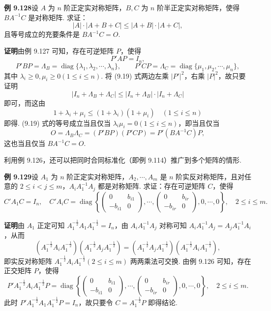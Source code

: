 \documentclass[UTF8,12pt,a4paper,fontset=fandol]{ctexart}
\begin{document}
\noindent\textbf{例 9.128}\quad 设 $A$ 为 $n$ 阶正定实对称矩阵，$B,C$ 为 $n$ 阶半正定实对称矩阵，使得 $BA^{-1}C$ 是对称矩阵. 求证：
\begin{equation}
|A|\cdot|A+B+C|\le |A+B|\cdot|A+C|,
\tag{9.19}
\end{equation}
且等号成立的充要条件是 $BA^{-1}C=O$.

\noindent\textbf{证明}\quad 由例 9.127 可知，存在可逆矩阵 $P$，使得
\[
P'AP=I_n,
\]
\[
P'BP=\Lambda_B=\operatorname{diag}\{\lambda_1,\lambda_2,\cdots,\lambda_n\},\qquad
P'CP=\Lambda_C=\operatorname{diag}\{\mu_1,\mu_2,\cdots,\mu_n\},
\]
其中 $\lambda_i\ge0,\mu_i\ge0(1\le i\le n)$. 将 (9.19) 式两边左乘 $|P'|^2$，右乘 $|P|^2$，故只要证明
\[
|I_n+\Lambda_B+\Lambda_C|\le |I_n+\Lambda_B|\cdot|I_n+\Lambda_C|
\]
即可，而这由
\[
1+\lambda_i+\mu_i\le(1+\lambda_i)(1+\mu_i)\quad (1\le i\le n)
\]
即得. (9.19) 式的等号成立当且仅当 $\lambda_i\mu_i=0(1\le i\le n)$，即当且仅当
\[
O=\Lambda_B\Lambda_C=(P'BP)(P'CP)=P'(BA^{-1}C)P,
\]
这也当且仅当 $BA^{-1}C=O$.

利用例 9.126，还可以把同时合同标准化（即例 9.114）推广到多个矩阵的情形.

\noindent\textbf{例 9.129}\quad 设 $A_1$ 为 $n$ 阶正定实对称矩阵，$A_2,\cdots,A_m$ 是 $n$ 阶实反对称矩阵，且对任意的 $2\le i<j\le m$，$A_iA_1^{-1}A_j$ 都是对称矩阵. 求证：存在可逆矩阵 $C$，使得
\[
C'A_1C=I_n,\quad
C'A_iC=\operatorname{diag}\left\{
\begin{pmatrix}
0&b_{i1}\\
-b_{i1}&0
\end{pmatrix},\cdots,
\begin{pmatrix}
0&b_{ir}\\
-b_{ir}&0
\end{pmatrix},
0,\cdots,0
\right\},\quad 2\le i\le m.
\]

\noindent\textbf{证明}\quad 由 $A_1$ 正定可知 $A_1^{-\frac12}A_1A_1^{-\frac12}=I_n$，由 $A_iA_1^{-1}A_j$ 对称可知 $A_iA_1^{-1}A_j=A_jA_1^{-1}A_i$，从而
\[
(A_1^{-\frac12}A_iA_1^{-\frac12})(A_1^{-\frac12}A_jA_1^{-\frac12})
=(A_1^{-\frac12}A_jA_1^{-\frac12})(A_1^{-\frac12}A_iA_1^{-\frac12}),
\]
即实反对称矩阵 $A_1^{-\frac12}A_iA_1^{-\frac12}(2\le i\le m)$ 两两乘法可交换. 由例 9.126 可知，存在正交矩阵 $P$，使得
\[
P'A_1^{-\frac12}A_iA_1^{-\frac12}P=\operatorname{diag}\left\{
\begin{pmatrix}
0&b_{i1}\\
-b_{i1}&0
\end{pmatrix},\cdots,
\begin{pmatrix}
0&b_{ir}\\
-b_{ir}&0
\end{pmatrix},
0,\cdots,0
\right\},\quad 2\le i\le m.
\]
此时 $P'A_1^{-\frac12}A_1A_1^{-\frac12}P=I_n$，故只要令 $C=A_1^{-\frac12}P$ 即得结论.
\end{document}
